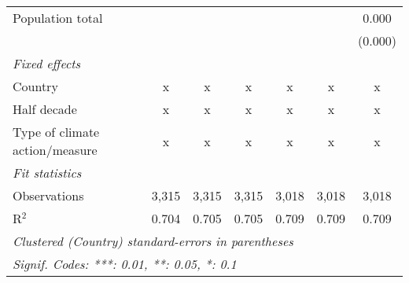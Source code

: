 \begin{tabular}{lcccccc}
   Population total                         &         &               &               &                &               & 0.000\\   
                                            &         &               &               &                &               & (0.000)\\   
   \emph{Fixed effects}\\
   Country                                  & x       & x             & x             & x              & x             & x\\  
   Half decade                              & x       & x             & x             & x              & x             & x\\  
   Type of climate action/measure           & x       & x             & x             & x              & x             & x\\  
   \midrule \emph{Fit statistics}\\
   Observations                             & 3,315   & 3,315         & 3,315         & 3,018          & 3,018         & 3,018\\  
   R$^2$                                    & 0.704   & 0.705         & 0.705         & 0.709          & 0.709         & 0.709\\  
   \midrule
   \multicolumn{7}{l}{\emph{Clustered (Country) standard-errors in parentheses}}\\
   \multicolumn{7}{l}{\emph{Signif. Codes: ***: 0.01, **: 0.05, *: 0.1}}\\
\end{tabular}
\par\endgroup


